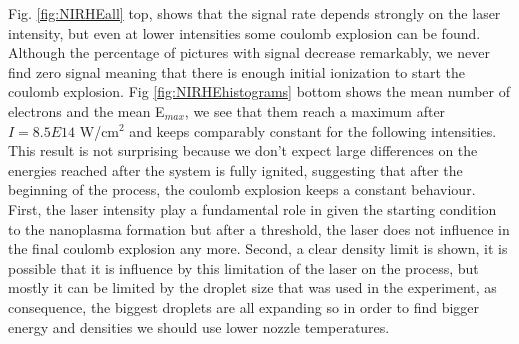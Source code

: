

Fig. \ref{fig:NIRHEall} top, shows that the signal rate depends strongly on the laser intensity, but even at lower intensities some coulomb explosion can be found. Although the percentage of pictures with signal decrease remarkably, we never find zero signal meaning that there is enough  initial ionization to start the coulomb explosion. Fig \ref{fig:NIRHEhistograms} bottom shows the mean number of electrons and the mean E$_{max}$, we see that them reach a maximum after $I=8.5E14$ W/cm$^{2}$ and keeps comparably constant for the following intensities. This result is not surprising because we don't expect large differences on the energies reached after the system is fully ignited, suggesting that after the beginning of the process, the coulomb explosion keeps a constant behaviour. First, the laser intensity play a fundamental role in given the starting condition to the nanoplasma formation but after a threshold, the laser does not influence in the final coulomb explosion any more. Second, a clear density limit is shown, it is possible that it is influence by this limitation of the laser on the process, but mostly it can be limited by the droplet size that was used in the experiment, as consequence, the biggest droplets are all expanding so in order to find bigger energy and densities we should use lower nozzle temperatures.  

